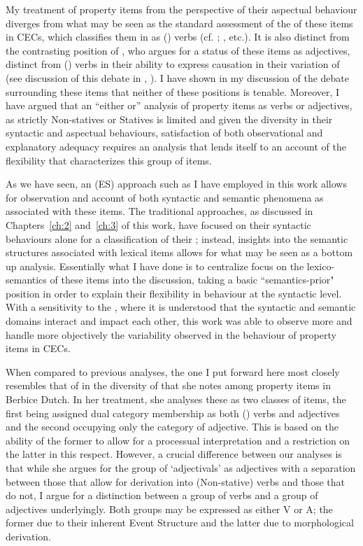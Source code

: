 My treatment of property items from the perspective of their aspectual behaviour diverges from what may be seen as the standard assessment of the  of these items in CECs, which classifies them in  as () verbs (cf. \citealt{Sebba1986, Alleyne1980}; \citealt{Winford1993}, etc.). It is also distinct from the contrasting position of \citet{Seuren1986}, who argues for a status of these items as adjectives, distinct from () verbs in their ability to express causation in their variation of  (see discussion of this debate in , ). I have shown in my discussion of the debate surrounding these items that neither of these positions is tenable. Moreover, I have argued that an ``either or” analysis of property items as verbs or adjectives, as strictly Non-statives or Statives is limited and given the diversity in their syntactic and aspectual behaviours, satisfaction of both observational and explanatory adequacy requires an analysis that lends itself to an account of the flexibility that characterizes this group of items. 

As we have seen, an  (ES) approach such as I have employed in this work allows for observation and account of both syntactic and semantic phenomena as associated with these items. The traditional approaches, as discussed in Chapters~\ref{ch:2} and~\ref{ch:3} of this work, have focused on their syntactic behaviours alone for a classification of their ; instead, insights into the semantic structures associated with lexical items allows for what may be seen as a bottom up analysis. Essentially what I have done is to centralize focus on the lexico-semantics of these items into the discussion, taking a basic ``semantics-prior" position in order to explain their flexibility in behaviour at the syntactic level. With a sensitivity to the , where it is understood that the syntactic and semantic domains interact and impact each other, this work was able to observe more and handle more objectively the variability observed in the behaviour of property items in CECs. 

When compared to previous analyses, the one I put forward here most closely resembles that of \citet{Kouwenberg1996} in the diversity of  that she notes among property items in Berbice Dutch. In her treatment, she analyses these as two classes of items, the first being assigned dual category membership as both () verbs and adjectives and the second occupying only the category of adjective. This is based on the ability of the former to allow for a processual interpretation and a restriction on the latter in this respect. However, a crucial difference between our analyses is that while she argues for the group of  `adjectivals’ as adjectives with a separation between those that allow for derivation into (Non-stative) verbs and those that do not, I argue for a distinction between a group of verbs and a group of adjectives underlyingly. Both groups may be expressed as either V or A; the former due to their inherent Event Structure and the latter due to morphological derivation. 

